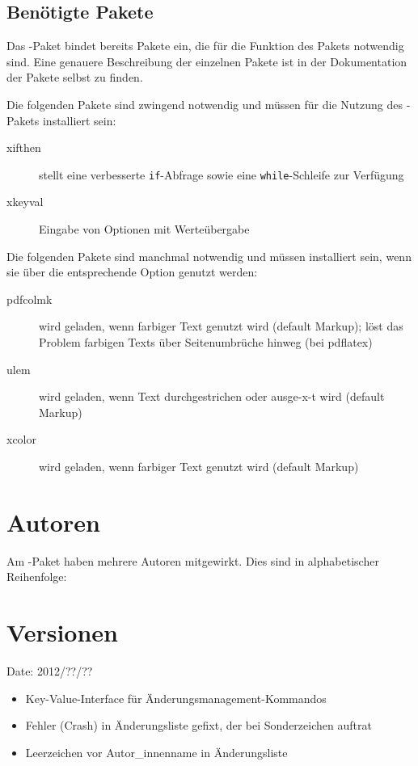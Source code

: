 \subsection{Benötigte Pakete}
\label{sec:user:packages}

Das -Paket bindet bereits Pakete ein, die für die Funktion des Pakets notwendig sind.
Eine genauere Beschreibung der einzelnen Pakete ist in der Dokumentation der Pakete selbst zu finden.

Die folgenden Pakete sind zwingend notwendig und müssen für die Nutzung des -Pakets installiert sein:
\begin{description}
	\item [xifthen] stellt eine verbesserte \texttt{if}-Abfrage sowie eine \texttt{while}-Schleife zur Verfügung
	\item [xkeyval] Eingabe von Optionen mit Werteübergabe
\end{description}

Die folgenden Pakete sind manchmal notwendig und müssen installiert sein, wenn sie über die entsprechende Option genutzt werden:
\begin{description}
	\item [pdfcolmk] wird geladen, wenn farbiger Text genutzt wird (default Markup); löst das Problem farbigen Texts über Seitenumbrüche hinweg (bei pdflatex)
	\item [ulem] wird geladen, wenn Text durchgestrichen oder ausge-x-t wird (default Markup)
	\item [xcolor] wird geladen, wenn farbiger Text genutzt wird (default Markup)
\end{description}


\section{Autoren}
\label{sec:authors}

Am -Paket haben mehrere Autoren mitgewirkt.
Dies sind in alphabetischer Reihenfolge:



\section{Versionen}
\label{sec:versions}


Date: 2012/??/??
\begin{itemize}
	\item Key-Value-Interface für Änderungsmanagement-Kommandos
	\item Fehler (Crash) in Änderungsliste gefixt, der bei Sonderzeichen auftrat
	\item Leerzeichen vor Autor\_innenname in Änderungsliste
\end{itemize}

